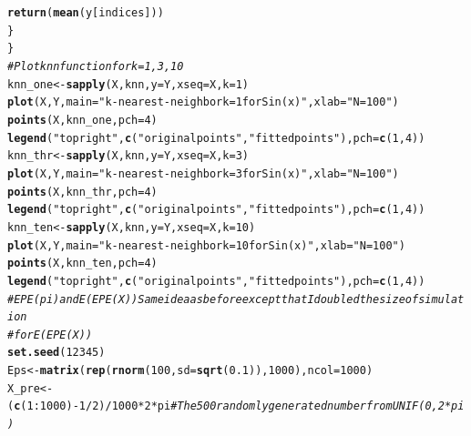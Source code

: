 \documentclass{article}\usepackage[]{graphicx}\usepackage[]{color}
\makeatletter
\newcommand{\hlnum}[1]{\textcolor[rgb]{0.686,0.059,0.569}{#1}}%
\newcommand{\hlstr}[1]{\textcolor[rgb]{0.192,0.494,0.8}{#1}}%
\newcommand{\hlcom}[1]{\textcolor[rgb]{0.678,0.584,0.686}{\textit{#1}}}%
\newcommand{\hlopt}[1]{\textcolor[rgb]{0,0,0}{#1}}%
\newcommand{\hlstd}[1]{\textcolor[rgb]{0.345,0.345,0.345}{#1}}%
\newcommand{\hlkwb}[1]{\textcolor[rgb]{0.69,0.353,0.396}{#1}}%
\newcommand{\hlkwc}[1]{\textcolor[rgb]{0.333,0.667,0.333}{#1}}%
\newcommand{\hlkwd}[1]{\textcolor[rgb]{0.737,0.353,0.396}{\textbf{#1}}}%
\newenvironment{kframe}{%
 \def\at@end@of@kframe{}%
 \ifinner\ifhmode%
  \def\at@end@of@kframe{\end{minipage}}%
  \begin{minipage}{\columnwidth}%
 \fi\fi%
 \def\FrameCommand##1{\hskip\@totalleftmargin \hskip-\fboxsep
 \colorbox{shadecolor}{##1}\hskip-\fboxsep
     \hskip-\linewidth \hskip-\@totalleftmargin \hskip\columnwidth}%
 \MakeFramed {\advance\hsize-\width
   \@totalleftmargin\z@ \linewidth\hsize
   \@setminipage}}%
 {\par\unskip\endMakeFramed%
 \at@end@of@kframe}
\newenvironment{knitrout}{}{} %
\makeatother
\begin{document}
\begin{knitrout}
\begin{kframe}
\begin{alltt}
        \hlkwd{return}\hlstd{(}\hlkwd{mean}\hlstd{(y[indices]))}
    \hlstd{\}}
\hlstd{\}}
\hlcom{# Plot knn function for k = 1,3,10}
\hlstd{knn_one} \hlkwb{<-} \hlkwd{sapply}\hlstd{(X, knn,} \hlkwc{y} \hlstd{= Y,} \hlkwc{xseq} \hlstd{= X,} \hlkwc{k} \hlstd{=} \hlnum{1}\hlstd{)}
\hlkwd{plot}\hlstd{(X, Y,} \hlkwc{main} \hlstd{=} \hlstr{"k-nearest-neighbor k = 1 for Sin(x)"}\hlstd{,} \hlkwc{xlab} \hlstd{=} \hlstr{"N = 100"}\hlstd{)}
\hlkwd{points}\hlstd{(X, knn_one,} \hlkwc{pch} \hlstd{=} \hlnum{4}\hlstd{)}
\hlkwd{legend}\hlstd{(}\hlstr{"topright"}\hlstd{,} \hlkwd{c}\hlstd{(}\hlstr{"original points"}\hlstd{,} \hlstr{"fitted points"}\hlstd{),} \hlkwc{pch} \hlstd{=} \hlkwd{c}\hlstd{(}\hlnum{1}\hlstd{,} \hlnum{4}\hlstd{))}
\hlstd{knn_thr} \hlkwb{<-} \hlkwd{sapply}\hlstd{(X, knn,} \hlkwc{y} \hlstd{= Y,} \hlkwc{xseq} \hlstd{= X,} \hlkwc{k} \hlstd{=} \hlnum{3}\hlstd{)}
\hlkwd{plot}\hlstd{(X, Y,} \hlkwc{main} \hlstd{=} \hlstr{"k-nearest-neighbor k = 3 for Sin(x)"}\hlstd{,} \hlkwc{xlab} \hlstd{=} \hlstr{"N = 100"}\hlstd{)}
\hlkwd{points}\hlstd{(X, knn_thr,} \hlkwc{pch} \hlstd{=} \hlnum{4}\hlstd{)}
\hlkwd{legend}\hlstd{(}\hlstr{"topright"}\hlstd{,} \hlkwd{c}\hlstd{(}\hlstr{"original points"}\hlstd{,} \hlstr{"fitted points"}\hlstd{),} \hlkwc{pch} \hlstd{=} \hlkwd{c}\hlstd{(}\hlnum{1}\hlstd{,} \hlnum{4}\hlstd{))}
\hlstd{knn_ten} \hlkwb{<-} \hlkwd{sapply}\hlstd{(X, knn,} \hlkwc{y} \hlstd{= Y,} \hlkwc{xseq} \hlstd{= X,} \hlkwc{k} \hlstd{=} \hlnum{10}\hlstd{)}
\hlkwd{plot}\hlstd{(X, Y,} \hlkwc{main} \hlstd{=} \hlstr{"k-nearest-neighbor k = 10 for Sin(x)"}\hlstd{,} \hlkwc{xlab} \hlstd{=} \hlstr{"N = 100"}\hlstd{)}
\hlkwd{points}\hlstd{(X, knn_ten,} \hlkwc{pch} \hlstd{=} \hlnum{4}\hlstd{)}
\hlkwd{legend}\hlstd{(}\hlstr{"topright"}\hlstd{,} \hlkwd{c}\hlstd{(}\hlstr{"original points"}\hlstd{,} \hlstr{"fitted points"}\hlstd{),} \hlkwc{pch} \hlstd{=} \hlkwd{c}\hlstd{(}\hlnum{1}\hlstd{,} \hlnum{4}\hlstd{))}
\hlcom{# EPE(pi) and E(EPE(X)) Same idea as before except that I doubled the size of simulation}
\hlcom{# for E(EPE(X))}
\hlkwd{set.seed}\hlstd{(}\hlnum{12345}\hlstd{)}
\hlstd{Eps} \hlkwb{<-} \hlkwd{matrix}\hlstd{(}\hlkwd{rep}\hlstd{(}\hlkwd{rnorm}\hlstd{(}\hlnum{100}\hlstd{,} \hlkwc{sd} \hlstd{=} \hlkwd{sqrt}\hlstd{(}\hlnum{0.1}\hlstd{)),} \hlnum{1000}\hlstd{),} \hlkwc{ncol} \hlstd{=} \hlnum{1000}\hlstd{)}
\hlstd{X_pre} \hlkwb{<-} \hlstd{(}\hlkwd{c}\hlstd{(}\hlnum{1}\hlopt{:}\hlnum{1000}\hlstd{)} \hlopt{-} \hlnum{1}\hlopt{/}\hlnum{2}\hlstd{)}\hlopt{/}\hlnum{1000} \hlopt{*} \hlnum{2} \hlopt{*} \hlstd{pi}  \hlcom{# The 500 randomly generated number from        UNIF(0, 2*pi)}

\end{alltt}
\end{kframe}
\end{knitrout}
\end{document}
